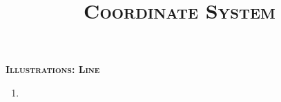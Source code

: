 \documentclass{article}
\title{\textsc{Coordinate System}}
\begin{document}
\maketitle


    
    \begin{center}
        \textsc{\large\textbf{Illustrations: Line}}
    \end{center}
    \begin{enumerate}
        \item 
    \end{enumerate}
\end{document}
